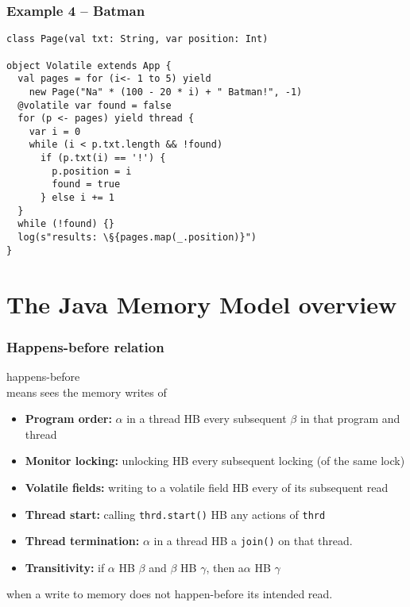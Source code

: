 \documentclass[aspectratio=169]{beamer}
\begin{document}
\begin{frame}[fragile]\frametitle{Example 4 -- Batman}
\begin{lstlisting}[emph={sleep,log,thread,join,synchronized,wait,notify,volatile}]
class Page(val txt: String, var position: Int)

object Volatile extends App {
  val pages = for (i<- 1 to 5) yield
    new Page("Na" * (100 - 20 * i) + " Batman!", -1)
  @volatile var found = false
  for (p <- pages) yield thread {
    var i = 0
    while (i < p.txt.length && !found)
      if (p.txt(i) == '!') {
        p.position = i
        found = true
      } else i += 1
  }
  while (!found) {}
  log(s"results: \§{pages.map(_.position)}")
}
\end{lstlisting}
\end{frame}


\section{The Java Memory Model overview}

\begin{frame}\frametitle{Happens-before relation}
\centering

 \alert{happens-before} \\
means   sees the memory writes of 

\begin{itemize}
\item \textbf{Program order:} $\alpha$ in a thread \alert{HB} every subsequent $\beta$ in that program and thread
\item \textbf{Monitor locking:} unlocking \alert{HB} every subsequent locking (of the same lock)
\item \textbf{Volatile fields:} writing to a volatile field \alert{HB} every of its subsequent read
\item \textbf{Thread start:} calling \texttt{thrd.start()} \alert{HB} any actions of \texttt{thrd}
\item \textbf{Thread termination:} $\alpha$ in a thread \alert{HB} a \texttt{join()} on that thread.
\item \textbf{Transitivity:} if $\alpha$ \alert{HB} $\beta$ and $\beta$ \alert{HB} $\gamma$, then a$\alpha$ \alert{HB} $\gamma$
\end{itemize}

\pause
{} when a write to memory does not \alert{happen-before} its intended read.
\end{frame}
\end{document}
